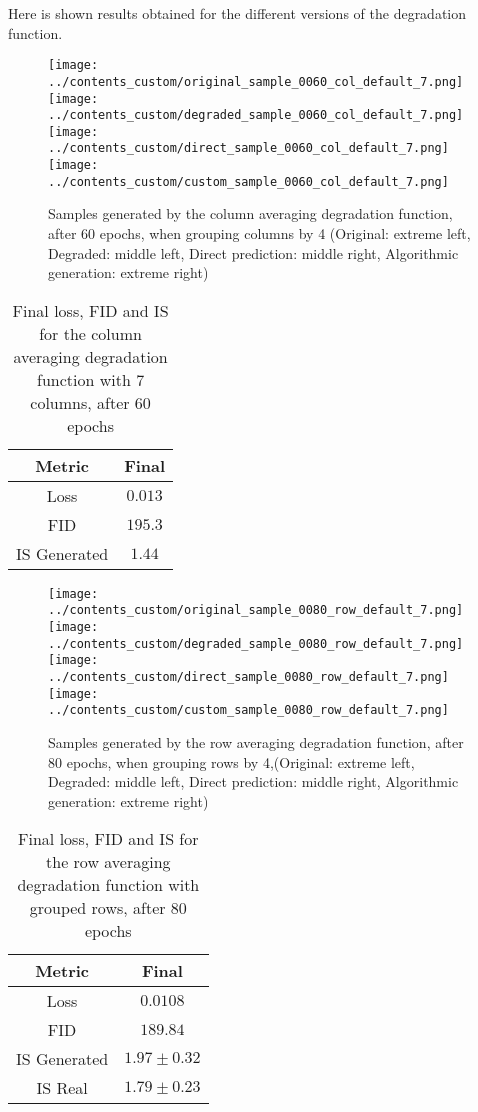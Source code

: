 \documentclass[12pt]{report} %
\begin{document}
Here is shown results obtained for the different versions of the degradation function.

\begin{figure}[h]
  \centering
  \texttt{[image: ../contents\_custom/original\_sample\_0060\_col\_default\_7.png]}
  \texttt{[image: ../contents\_custom/degraded\_sample\_0060\_col\_default\_7.png]}
  \texttt{[image: ../contents\_custom/direct\_sample\_0060\_col\_default\_7.png]}
  \texttt{[image: ../contents\_custom/custom\_sample\_0060\_col\_default\_7.png]}
  \captionsetup{font=footnotesize}
  \caption{Samples generated by the column averaging degradation function, after 60 epochs, when grouping columns by 4 (Original: extreme left, Degraded: middle left, Direct prediction: middle right, Algorithmic generation: extreme right)}
  \label{fig:col7}
\end{figure}

\begin{table}
  \centering
  \begin{tabular}{c c}
    \hline
    Metric & Final \\
    \hline
    Loss & $0.013$ \\
    FID & $195.3$ \\
    IS Generated & $1.44$ \\
    \hline
  \end{tabular}
  \caption{Final loss, FID and IS for the column averaging degradation function with 7 columns, after 60 epochs}
  \captionsetup{font=footnotesize}
  \label{tab:col7}
\end{table}

\begin{figure}[h]
  \centering
  \texttt{[image: ../contents\_custom/original\_sample\_0080\_row\_default\_7.png]}
  \texttt{[image: ../contents\_custom/degraded\_sample\_0080\_row\_default\_7.png]}
  \texttt{[image: ../contents\_custom/direct\_sample\_0080\_row\_default\_7.png]}
  \texttt{[image: ../contents\_custom/custom\_sample\_0080\_row\_default\_7.png]}
  \captionsetup{font=footnotesize}
  \caption{Samples generated by the row averaging degradation function, after 80 epochs, when grouping rows by 4,(Original: extreme left, Degraded: middle left, Direct prediction: middle right, Algorithmic generation: extreme right)}
  \label{fig:row7}
\end{figure}

\begin{table}
  \centering
  \begin{tabular}{c c}
    \hline
    Metric & Final \\
    \hline
    Loss & $0.0108$ \\
    FID & $189.84$ \\
    IS Generated & $1.97 \pm 0.32$ \\
    IS Real & $1.79 \pm 0.23$ \\
    \hline
  \end{tabular}
  \captionsetup{font=footnotesize}
  \caption{Final loss, FID and IS for the row averaging degradation function with grouped rows, after 80 epochs}
  \label{tab:row7}
\end{table}
\end{document}
